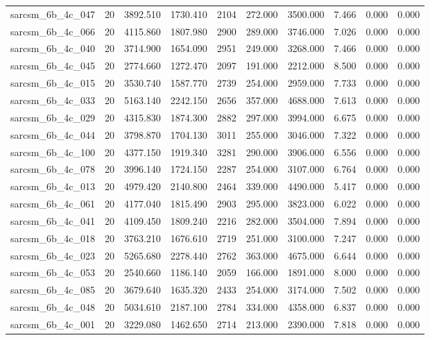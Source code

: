 \begin{tabular}{lrrrrrrrrr}
sarcsm\_6b\_4c\_047 & 20 & 3892.510 & 1730.410 & 2104 & 272.000 & 3500.000 & 7.466 & 0.000 & 0.000 \\
sarcsm\_6b\_4c\_066 & 20 & 4115.860 & 1807.980 & 2900 & 289.000 & 3746.000 & 7.026 & 0.000 & 0.000 \\
sarcsm\_6b\_4c\_040 & 20 & 3714.900 & 1654.090 & 2951 & 249.000 & 3268.000 & 7.466 & 0.000 & 0.000 \\
sarcsm\_6b\_4c\_045 & 20 & 2774.660 & 1272.470 & 2097 & 191.000 & 2212.000 & 8.500 & 0.000 & 0.000 \\
sarcsm\_6b\_4c\_015 & 20 & 3530.740 & 1587.770 & 2739 & 254.000 & 2959.000 & 7.733 & 0.000 & 0.000 \\
sarcsm\_6b\_4c\_033 & 20 & 5163.140 & 2242.150 & 2656 & 357.000 & 4688.000 & 7.613 & 0.000 & 0.000 \\
sarcsm\_6b\_4c\_029 & 20 & 4315.830 & 1874.300 & 2882 & 297.000 & 3994.000 & 6.675 & 0.000 & 0.000 \\
sarcsm\_6b\_4c\_044 & 20 & 3798.870 & 1704.130 & 3011 & 255.000 & 3046.000 & 7.322 & 0.000 & 0.000 \\
sarcsm\_6b\_4c\_100 & 20 & 4377.150 & 1919.340 & 3281 & 290.000 & 3906.000 & 6.556 & 0.000 & 0.000 \\
sarcsm\_6b\_4c\_078 & 20 & 3996.140 & 1724.150 & 2287 & 254.000 & 3107.000 & 6.764 & 0.000 & 0.000 \\
sarcsm\_6b\_4c\_013 & 20 & 4979.420 & 2140.800 & 2464 & 339.000 & 4490.000 & 5.417 & 0.000 & 0.000 \\
sarcsm\_6b\_4c\_061 & 20 & 4177.040 & 1815.490 & 2903 & 295.000 & 3823.000 & 6.022 & 0.000 & 0.000 \\
sarcsm\_6b\_4c\_041 & 20 & 4109.450 & 1809.240 & 2216 & 282.000 & 3504.000 & 7.894 & 0.000 & 0.000 \\
sarcsm\_6b\_4c\_018 & 20 & 3763.210 & 1676.610 & 2719 & 251.000 & 3100.000 & 7.247 & 0.000 & 0.000 \\
sarcsm\_6b\_4c\_023 & 20 & 5265.680 & 2278.440 & 2762 & 363.000 & 4675.000 & 6.644 & 0.000 & 0.000 \\
sarcsm\_6b\_4c\_053 & 20 & 2540.660 & 1186.140 & 2059 & 166.000 & 1891.000 & 8.000 & 0.000 & 0.000 \\
sarcsm\_6b\_4c\_085 & 20 & 3679.640 & 1635.320 & 2433 & 254.000 & 3174.000 & 7.502 & 0.000 & 0.000 \\
sarcsm\_6b\_4c\_048 & 20 & 5034.610 & 2187.100 & 2784 & 334.000 & 4358.000 & 6.837 & 0.000 & 0.000 \\
sarcsm\_6b\_4c\_001 & 20 & 3229.080 & 1462.650 & 2714 & 213.000 & 2390.000 & 7.818 & 0.000 & 0.000 \\

\end{tabular}
